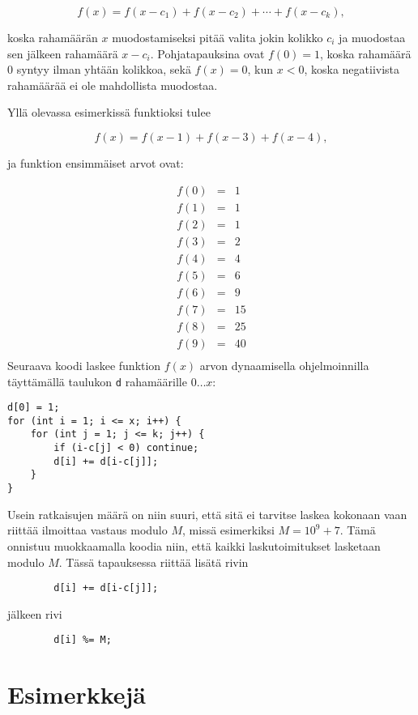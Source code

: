\[ f(x) = f(x-c_1)+f(x-c_2)+\cdots+f(x-c_k),\]

\noindent
koska rahamäärän $x$ muodostamiseksi pitää
valita jokin kolikko $c_i$ ja muodostaa sen jälkeen rahamäärä $x-c_i$.
Pohjatapauksina ovat $f(0)=1$, koska rahamäärä 0 syntyy
ilman yhtään kolikkoa,
sekä $f(x)=0$, kun $x<0$, koska negatiivista rahamäärää
ei ole mahdollista muodostaa.

Yllä olevassa esimerkissä funktioksi tulee

\[ f(x) = f(x-1)+f(x-3)+f(x-4), \]

ja funktion ensimmäiset arvot ovat:

\[
\begin{array}{lcl}
f(0) & = & 1 \\
f(1) & = & 1 \\
f(2) & = & 1 \\
f(3) & = & 2 \\
f(4) & = & 4 \\
f(5) & = & 6 \\
f(6) & = & 9 \\
f(7) & = & 15 \\
f(8) & = & 25 \\
f(9) & = & 40 \\
\end{array}
\]
\newpage
Seuraava koodi laskee funktion $f(x)$ arvon
dynaamisella ohjelmoinnilla täyttämällä taulukon
\texttt{d} rahamäärille $0 \ldots x$:

\begin{lstlisting}
d[0] = 1;
for (int i = 1; i <= x; i++) {
    for (int j = 1; j <= k; j++) {
        if (i-c[j] < 0) continue;
        d[i] += d[i-c[j]];
    }
}
\end{lstlisting}

Usein ratkaisujen määrä on niin suuri, että sitä ei tarvitse
laskea kokonaan vaan riittää ilmoittaa vastaus
modulo $M$, missä esimerkiksi $M=10^9+7$.
Tämä onnistuu muokkaamalla koodia niin,
että kaikki laskutoimitukset lasketaan modulo $M$.
Tässä tapauksessa riittää lisätä rivin
\begin{lstlisting}
        d[i] += d[i-c[j]];
\end{lstlisting}
jälkeen rivi
\begin{lstlisting}
        d[i] %= M;
\end{lstlisting}

\section{Esimerkkejä}

